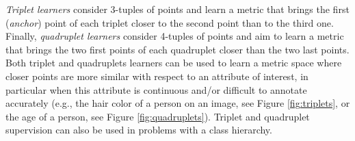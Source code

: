 \documentclass[twoside,11pt]{article}
\begin{document}
\emph{Triplet learners} consider 3-tuples of points and learn a metric that brings the first (\emph{anchor}) point of each triplet closer to the second point than to the third one.
Finally, \emph{quadruplet learners} consider 4-tuples of points and aim to learn a metric that brings the two first points of each quadruplet closer than the two last points.
Both triplet and quadruplets learners can be used to learn a metric space where closer points are more similar with respect to an attribute of interest, in particular when this attribute is continuous and/or difficult to annotate accurately (e.g., the hair color of a person on an image, see Figure \ref{fig:triplets}, or the age of a person, see Figure \ref{fig:quadruplets}).
Triplet and quadruplet supervision can also be used in problems with a class hierarchy.


\end{document}
